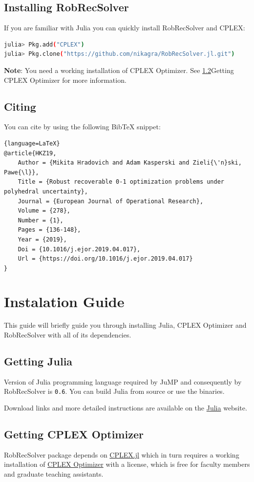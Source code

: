\subsection{Installing RobRecSolver}
If you are familiar with Julia you can quickly install RobRecSolver and CPLEX:
\begin{lstlisting}[language=Bash]
julia> Pkg.add("CPLEX")
julia> Pkg.clone("https://github.com/nikagra/RobRecSolver.jl.git")
\end{lstlisting}

\textbf{Note}: You need a working installation of CPLEX Optimizer. See \ref{sec:getting_cplex}{Getting CPLEX Optimizer} for more information.

\subsection{Citing}
You can cite \cite{HKZ19} by using the following BibTeX snippet:
\begin{lstlisting}{language=LaTeX}
@article{HKZ19,
	Author = {Mikita Hradovich and Adam Kasperski and Zieli{\'n}ski, Pawe{\l}},
	Title = {Robust recoverable 0-1 optimization problems under polyhedral uncertainty},
	Journal = {European Journal of Operational Research},
	Volume = {278},
	Number = {1},
	Pages = {136-148},
	Year = {2019},
	Doi = {10.1016/j.ejor.2019.04.017},
	Url = {https://doi.org/10.1016/j.ejor.2019.04.017}
}
\end{lstlisting}

\section{Instalation Guide}
This guide will briefly guide you through installing Julia, CPLEX Optimizer and RobRecSolver with all of its dependencies.

\subsection{Getting Julia}
Version of Julia programming language required by JuMP and consequently by RobRecSolver is \texttt{0.6}. You can build Julia from source or use the binaries.

Download links and more detailed instructions are available on the \href{https://julialang.org/downloads/}{Julia} website.

\subsection{Getting CPLEX Optimizer}
\label{sec:getting_cplex}
RobRecSolver package depends on \href{https://github.com/JuliaOpt/CPLEX.jl}{CPLEX.jl} which in turn requires a working installation of \href{https://www.ibm.com/analytics/cplex-optimizer}{CPLEX Optimizer} with a license, which is free for faculty members and graduate teaching assistants.

